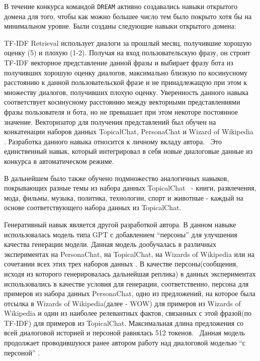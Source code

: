 В течение конкурса командой \texttt{DREAM} активно создавались навыки открытого домена для того, чтобы как можно большее число тем было покрыто хотя бы на минимальном уровне. Были созданы следующие навыки открытого домена:

TF-IDF Retrieval использует диалоги за прошлый месяц, получившие хорошую оценку (5) и плохую (1-2). Получая на вход пользовательскую фразу, он строит TF-IDF векторное представление данной фразы и выбирает фразу бота из получивших хорошую оценку диалогов, максимально близкую по косинусному расстоянию к данной пользовательской фразе и не принадлежащую при этом к множеству диалогов, получивших плохую оценку. Уверенность данного навыка соответствует косинусному расстоянию между векторными представлениями фразы пользователя и бота, но не превышает при этом некоторе постоянное значение. Векторизатор для получения представлений был обучен на конкатенации наборов данных TopicalChat\cite{topicalchat}, PersonaChat \cite{personachat} и Wizard of Wikipedia \cite{wow}. Разработка данного навыка относится к личному вкладу автора.  Это единственный навык, который интегрировал в себя новые диалоговые данные из конкурса в автоматическом режиме.

В дальнейшем было также обучено подмножество аналогичных навыков, покрывающих разные темы из набора данных TopicalChat  - книги, развлечения, мода, фильмы, музыка, политика, технологии, спорт и животные - каждый на основе соответствующего набора данных из TopicalChat.

Генеративный навык является другой разработкой автора. В данном навыке использовалась модель типа GPT\cite{radford_2018_gpt} с добавлением “персоны” для улучшения качества генерации модели. Данная модель дообучалась в различных экспериментах на PersonaChat, на TopicalChat, на Wizards of Wikipedia или на сочетании всех этих трех наборов данных . В качестве персоны(сообщения, исходя из которого генерировалась дальнейшая реплика) в данных экспериментах использовались в качестве условия для генерации, соответственно, персона для примеров из набора данных PersonaChat, одно из предложений, на которое была отсылка в Wizards of Wikipedia(далее - WOW) для примеров из Wizards of Wikipedia и один из наиболее релевантных фактов, связанных с этой фразой(по TF-IDF) для примеров из TopicalChat. Максимальная длина предложения со всей диалоговой историей и персоной равнялась 512 токенов.  Данная модель продолжает проводившуюся ранее автором работу над диалоговой моделью “с персоной” \cite{Болотин_Карпов_Рашков_Шкурак_2019}.

